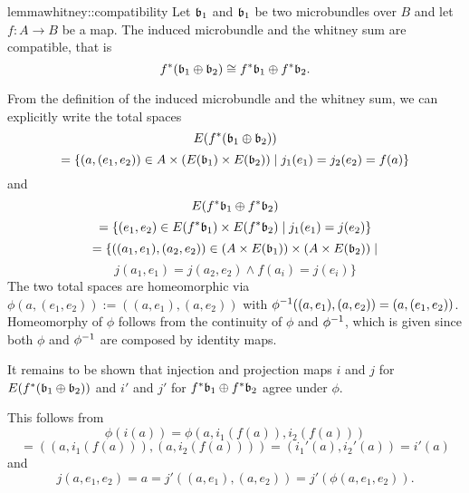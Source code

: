 \begin{mystatement}{lemma}{whitney::compatibility}
    Let $\bb_1$ and $\bb_1$ be two microbundles over $B$ and let $f: A \to B$ be a map.
    The induced microbundle and the whitney sum are compatible, that is
    \[ \ind{f}(\whitney{\bb_1}{\bb_2}) \cong \whitney{\ind{f}\bb_1}{\ind{f}\bb_2}. \]
\end{mystatement}

\begin{myproof}
    From the definition of the induced microbundle and the whitney sum, we can explicitly write the total spaces
    \[ E(\ind{f}(\whitney{\bb_1}{\bb_2})) \]
    \[ = \{(a, (e_1, e_2)) \in A \cross (E(\bb_1) \cross E(\bb_2)) \mid j_1(e_1) = j_2(e_2) = f(a) \} \]
    and
    \[ E(\whitney{\ind{f}\bb_1}{\ind{f}\bb_2}) \]
    \[ = \{(e_1, e_2) \in E(\ind{f}\bb_1) \cross E(\ind{f}\bb_2) \mid j_1(e_1) = j(e_2)\}\]
    \[ = \{((a_1, e_1), (a_2, e_2)) \in (A \cross E(\bb_1)) \cross (A \cross E(\bb_2)) \mid \]
    \[ j(a_1, e_1) = j(a_2, e_2) \land f(a_i) = j(e_i)\} \]
    The two total spaces are homeomorphic via $\phi(a, (e_1, e_2)) := ((a, e_1), (a, e_2))$ with $\phi^{-1}((a, e_1), (a, e_2)) = (a, (e_1, e_2))$.
    Homeomorphy of $\phi$ follows from the continuity of $\phi$ and $\phi^{-1}$, which is given since both $\phi$ and $\phi^{-1}$ are composed by identity maps.
    
    It remains to be shown that injection and projection maps $i$ and $j$ for $E(\ind{f}(\whitney{\bb_1}{\bb_2}))$
    and $i'$ and $j'$ for $\whitney{\ind{f}\bb_1}{\ind{f}\bb_2}$ agree under $\phi$.

    This follows from
    \[ \phi(i(a)) = \phi(a, i_1(f(a)), i_2(f(a))) \]
    \[ = ((a, i_1(f(a))), (a, i_2(f(a)))) = (i_1'(a), i_2'(a)) = i'(a) \]
    and
    \[ j(a, e_1, e_2) = a = j'((a, e_1), (a, e_2)) = j'(\phi(a, e_1, e_2)). \]
\end{myproof}
